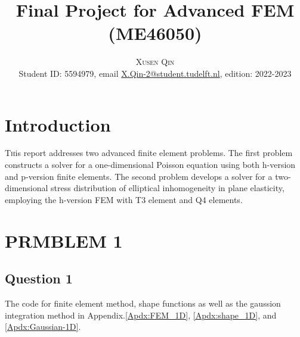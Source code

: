 \documentclass[twoside,twocolumn,10pt]{article}
\title{Final Project for Advanced FEM (ME46050)} %
\author{%
\textsc{Xusen Qin} \\[1ex] %
\normalsize Student ID: 5594979, email \href{X.Qin-2@student.tudelft.nl}{X.Qin-2@student.tudelft.nl}, %
edition: 2022-2023
}
\date{} %
\begin{document}
\maketitle


\section{Introduction}

\lettrine[nindent=0em,lines=3]{T}his report addresses two advanced finite element problems. The first problem constructs a solver for a one-dimensional Poisson equation using both h-version and p-version finite elements. The second problem develops a solver for a two-dimensional stress distribution of elliptical inhomogeneity in plane elasticity, employing the h-version FEM with T3 element and Q4 elements.


\section{\textbf{PRMBLEM 1}}
\subsection{Question 1}

The code for finite element method, shape functions as well as the gaussion integration method in Appendix.\ref{Apdx:FEM_1D}, \ref{Apdx:shape_1D}, and \ref{Apdx:Gaussian-1D}.
\end{document}
